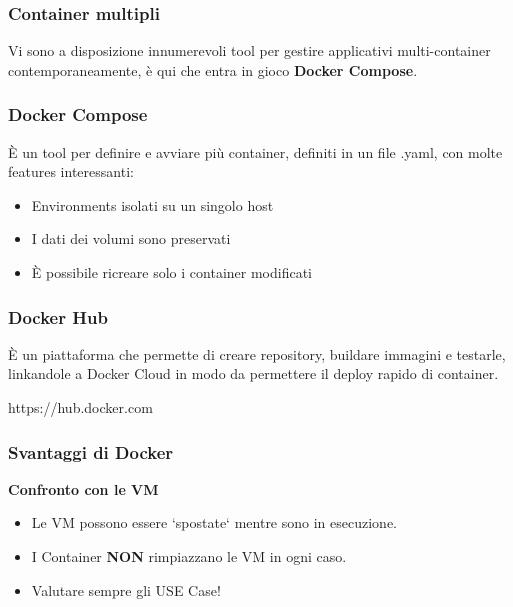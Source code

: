 \documentclass{beamer}
\begin{document}

\begin{frame}
    \frametitle{Container multipli}
    Vi sono a disposizione innumerevoli tool per gestire applicativi multi-container contemporaneamente, \`e qui che entra in gioco \textbf{Docker Compose}.
\end{frame}


\begin{frame}
    \frametitle{Docker Compose}
    \`E un tool per definire e avviare pi\`u container, definiti in un file .yaml, con molte features interessanti:
    \begin{itemize}
        \item<1-> Environments isolati su un singolo host
        \item<2-> I dati dei volumi sono preservati
        \item<3-> \`E possibile ricreare solo i container modificati
    \end{itemize}
\end{frame}


\begin{frame}
    \frametitle{Docker Hub}
    \`E un piattaforma che permette di creare repository, buildare immagini e testarle, linkandole a Docker Cloud in modo da permettere 
    il deploy rapido di container.
    \newline
    \begin{center}
        https://hub.docker.com
    \end{center}
\end{frame}


\begin{frame}
    \frametitle{Svantaggi di Docker}
    \begin{center}
        \textbf{Confronto con le VM}
    \end{center}
    \begin{itemize}
        \item<1-> Le VM possono essere `spostate` mentre sono in esecuzione. 
        \item<2-> I Container \textbf{NON} rimpiazzano le VM in ogni caso.
        \item<3-> Valutare sempre gli USE Case!
    \end{itemize}
\end{frame}
\end{document}
